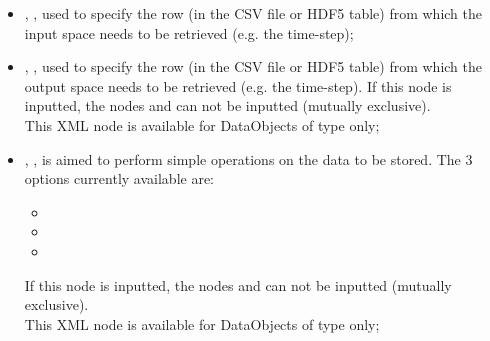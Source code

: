 \begin{itemize}
  \item {}, , used to
       specify  the row (in the CSV file or HDF5 table) from which the input space
      needs to be retrieved (e.g. the time-step);
  \item {}, , used to
       specify  the row (in the CSV file or HDF5 table) from which the output space
      needs to be retrieved (e.g. the time-step). If this node is inputted, the nodes
        and   can not be inputted (mutually exclusive).
     \\\nb This XML node is available for DataObjects of type  only;
  \item {}, , is aimed to perform
       simple operations on the data to be stored.
       The 3 options currently available are:
       \begin{itemize}
          \item {}
          \item {}
          \item {}
       \end{itemize}
       If this node is inputted, the nodes
        and   can not be inputted (mutually exclusive).
       \\\nb This XML node is available for DataObjects of type  only;

\end{itemize}
